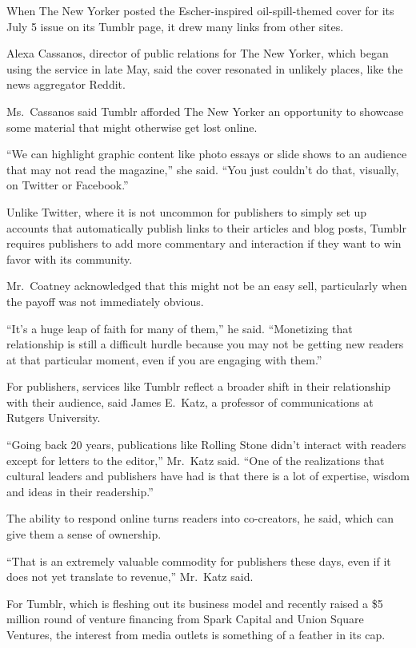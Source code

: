 ﻿\documentclass[12pt]{article}
\begin{document}
When The New Yorker posted the Escher-inspired oil-spill-themed cover for its July 5 issue on its
Tumblr page, it drew many links from other sites.

Alexa Cassanos, director of public relations for The New Yorker, which began using the service in
late May, said the cover resonated in unlikely places, like the news aggregator Reddit.

Ms.~Cassanos said Tumblr afforded The New Yorker an opportunity to showcase some material that might
otherwise get lost online.

``We can highlight graphic content like photo essays or slide shows to an audience that may not read
the magazine,'' she said. ``You just couldn't do that, visually, on Twitter or Facebook.''

Unlike Twitter, where it is not uncommon for publishers to simply set up accounts that automatically
publish links to their articles and blog posts, Tumblr requires publishers to add more commentary
and interaction if they want to win favor with its community.

Mr.~Coatney acknowledged that this might not be an easy sell, particularly when the payoff was not
immediately obvious.

``It's a huge leap of faith for many of them,'' he said. ``Monetizing that relationship is still a
difficult hurdle because you may not be getting new readers at that particular moment, even if you
are engaging with them.''

For publishers, services like Tumblr reflect a broader shift in their relationship with their
audience, said James E.~Katz, a professor of communications at Rutgers University.

``Going back 20 years, publications like Rolling Stone didn't interact with readers except for
letters to the editor,'' Mr.~Katz said. ``One of the realizations that cultural leaders and
publishers have had is that there is a lot of expertise, wisdom and ideas in their readership.''

The ability to respond online turns readers into co-creators, he said, which can give them a sense
of ownership.

``That is an extremely valuable commodity for publishers these days, even if it does not yet
translate to revenue,'' Mr.~Katz said.

For Tumblr, which is fleshing out its business model and recently raised a \$5 million round of
venture financing from Spark Capital and Union Square Ventures, the interest from media outlets is
something of a feather in its cap.
\end{document}

